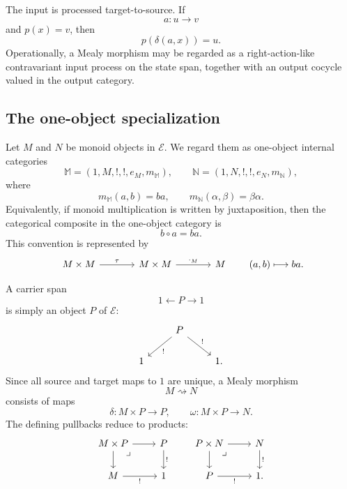 \begin{remark}
\label{rem:contravariant-input-processing}
    The input is processed target-to-source. If
    \[
        a:u\to v
    \]
    and \(p(x)=v\), then
    \[
        p(\delta(a,x))=u.
    \]
    Operationally, a Mealy morphism may be regarded as a right-action-like contravariant input process on the state span, together with an output cocycle valued in the output category.
\end{remark}

\subsection{The one-object specialization}
\label{subsec:one-object-mealy-morphisms}

Let \(M\) and \(N\) be monoid objects in \(\mathcal E\). We regard them as one-object internal categories
\[
    \mathbb M=(1,M,!,!,e_M,m_{\mathbb M}),
    \qquad
    \mathbb N=(1,N,!,!,e_N,m_{\mathbb N}),
\]
where
\[
    m_{\mathbb M}(a,b)=ba,
    \qquad
    m_{\mathbb N}(\alpha,\beta)=\beta\alpha.
\]
Equivalently, if monoid multiplication is written by juxtaposition, then the categorical composite in the one-object category is
\[
    b\circ a=ba.
\]
This convention is represented by
\[
    \begin{tikzcd}[column sep=large]
            M\times M
                \arrow[r, "\tau"]
        &
            M\times M
                \arrow[r, "\cdot_M"]
        &
            M
    \end{tikzcd}
    \qquad
    (a,b)\longmapsto ba.
\]

A carrier span
\[
    1\xleftarrow{}P\xrightarrow{}1
\]
is simply an object \(P\) of \(\mathcal E\):
\[
    \begin{tikzcd}
        & 
            P 
                \arrow[dl, "!"] 
                \arrow[dr, "!"] 
        & 
        \\
            1 
        &
        & 
            1.
    \end{tikzcd}
\]
Since all source and target maps to \(1\) are unique, a Mealy morphism
\[
    M\rightsquigarrow N
\]
consists of maps
\[
    \delta:M\times P\to P,
    \qquad
    \omega:M\times P\to N.
\]
The defining pullbacks reduce to products:
\[
    \begin{tikzcd}
            M\times P
                \arrow[r]
                \arrow[d]
                \arrow[dr, phantom, "\lrcorner", very near start]
        &
            P 
                \arrow[d, "!"]
        \\
            M 
                \arrow[r, "!"']
        &
            1
    \end{tikzcd}
    \qquad
    \begin{tikzcd}
            P\times N
                \arrow[r]
                \arrow[d]
                \arrow[dr, phantom, "\lrcorner", very near start]
        &
            N 
                \arrow[d, "!"]
        \\
            P 
                \arrow[r, "!"']
        &
            1.
    \end{tikzcd}
\]

